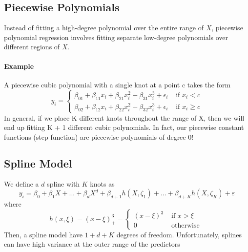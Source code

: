 \subsection{Piecewise Polynomials} 
Instead of fitting a high-degree polynomial over the entire range of $X$, piecewise polynomial regression involves fitting separate low-degree polynomials over different regions of $X$.
\paragraph{Example} A piecewise cubic polynomial with a single knot at a point c takes the form
\[ y_{i}=\left\{\begin{array}{ll}{\beta_{01}+\beta_{11} x_{i}+\beta_{21} x_{i}^{2}+\beta_{31} x_{i}^{3}+\epsilon_{i}} & {\text { if } x_{i}<c} \\ {\beta_{02}+\beta_{12} x_{i}+\beta_{22} x_{i}^{2}+\beta_{32} x_{i}^{3}+\epsilon_{i}} & {\text { if } x_{i} \geq c}\end{array}\right. \]
In general, if we place K different knots throughout the range of X, then we will end up fitting K + 1 different cubic polynomials.
In fact, our piecewise constant functions (step function) are piecewise polynomials of degree 0!

\subsection{Spline Model}
\label{subsec:SplineModel}
We define a $d$ spline with $K$ knots as
\[ y_{i}=\beta_{0}+\beta_{1} X + ... + \beta_{d}X^d+\beta_{d+1} h(X, \zeta_1) + ... + \beta_{d+K}h(X, \zeta_K) + \varepsilon\]
where
\[ h(x, \xi)=(x-\xi)_{+}^{3}=\left\{\begin{array}{cl}{(x-\xi)^{3}} & {\text { if } x>\xi} \\ {0} & {\text { otherwise }}\end{array}\right. \]
Then, a spline model have  $1 + d + K$ degrees of freedom.
Unfortunately, splines can have high variance at the outer range of the predictors

